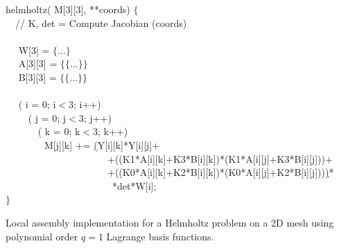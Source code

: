 \begin{algorithm}[t]
\scriptsize
{}

 helmholtz( M[3][3],  **coords) $\lbrace$\\
~~// K, det = Compute Jacobian (coords) \\
~~\\
~~ W[3] = $\lbrace$...$\rbrace$\\
~~ A[3][3] = $\lbrace\lbrace$...$\rbrace\rbrace$\\
~~ B[3][3] = $\lbrace\lbrace$...$\rbrace\rbrace$\\
~~\\
~~ ( i = 0; i$<$3; i++) \\
~~~~ ( j = 0; j$<$3; j++) \\
~~~~~~ ( k = 0; k$<$3; k++) \\
~~~~~~~~M[j][k] += \underline{(}Y[i][k]*Y[i][j]+\\
~~~~~~~~~~~~~~~~~~~~~+((K1*A[i][k]+K3*B[i][k])*(K1*A[i][j]+K3*B[i][j]))+\\
~~~~~~~~~~~~~~~~~~~~~+((K0*A[i][k]+K2*B[i][k])*(K0*A[i][j]+K2*B[i][j]))\underline{)}*\\
~~~~~~~~~~~~~~~~~~~~~~*det*W[i];\\
$\rbrace$
\caption{Local assembly implementation for a Helmholtz problem on a 2D mesh using polynomial order $q=1$ Lagrange basis functions.}
\label{code:helmholtz}
\end{algorithm}

